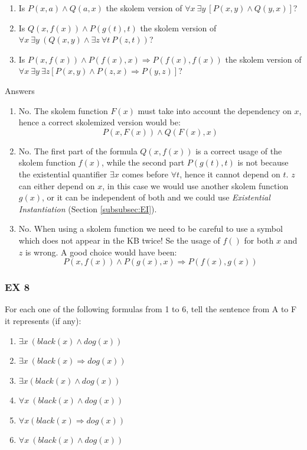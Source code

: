 \documentclass[10pt,a4paper]{article}
\begin{document}
\begin{itemize}
\begin{enumerate}
\item Is $ P(x,a)\wedge Q(a,x)$ the skolem version of $\forall x\ \exists y\ [P(x,y)\wedge Q(y,x)]$?
\item Is $ Q(x,f(x))\wedge P(g(t),t)$ the skolem version of $\forall x\ \exists y\ (Q(x,y)\wedge \exists z\ \forall t\ P(z,t))$?
\item Is $P(x,f(x))\wedge P(f(x),x)\Rightarrow P(f(x),f(x))$ the skolem version of $\forall x\ \exists y\  \exists z[P(x,y)\wedge P(z,x)\Rightarrow P(y,z)]$?
\end{enumerate}
Answers
\begin{enumerate}
\item No. The skolem function $F(x)$ must take into account the dependency on $x$, hence a correct skolemized version would be:
\[P(x,F(x))\wedge Q(F(x),x)\]
\item No. The first part of the formula $Q(x,f(x))$ is a correct usage of the skolem function $f(x)$, while the second part $P(g(t),t)$ is not because the existential quantifier  $\exists x$ comes before $\forall t$, hence it cannot depend on $t$. $z$ can either depend on $x$, in this case we would use another skolem function $g(x)$, or it can be independent of both and we could use \textit{Existential Instantiation} (Section \ref{subsubsec:EI}). 
\item No. When using a skolem function we need to be careful to use a symbol which does not appear in the KB twice! Se the usage of $f()$ for both $x$ and $z$ is wrong. A good choice would have been:
\[P(x,f(x))\wedge P(g(x),x)\Rightarrow P(f(x),g(x))\]


\end{enumerate}

\subsubsection{EX 8}
For each one of the following formulas from 1 to 6, tell the sentence from A to F it represents (if any):
\begin{enumerate}

\item $\exists x\ (black(x) \wedge dog(x))$
\item $\exists x\ (black(x)\Rightarrow dog(x)) $
\item $\exists x(black(x) \wedge dog(x))$
\item $\forall x\ (black(x) \wedge dog(x)) $
\item $\forall x(black(x)\Rightarrow dog(x))$
\item $\forall x\ (black(x) \wedge dog(x))$
\end{enumerate}


\end{itemize}
\end{document}
